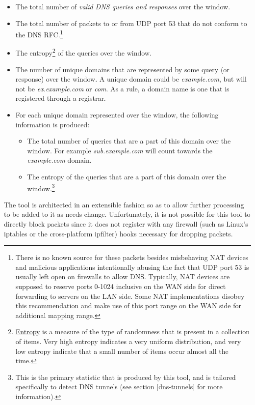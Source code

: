 \documentclass{article}
\theoremstyle{remark}
\theoremstyle{definition}
\theoremstyle{definition}
\theoremstyle{definition}
\begin{document}
\begin{itemize}
\item The total number of \emph{valid DNS queries and responses} over the window.
\item The total number of packets to or from UDP port 53 that do not conform to the DNS RFC.\footnote{There is no known source for these packets besides misbehaving NAT devices and malicious applications intentionally abusing the fact that UDP port 53 is usually left open on firewalls to allow DNS. Typically, NAT devices are supposed to reserve ports 0-1024 inclusive on the WAN side for direct forwarding to servers on the LAN side. Some NAT implementations disobey this recommendation and make use of this port range on the WAN side for additional mapping range.}
\item The entropy\footnote{\href{http://en.wikipedia.org/wiki/Entropy_(information_theory)}{Entropy} is a measure of the type of randomness that is present in a collection of items. Very high entropy indicates a very uniform distribution, and very low entropy indicate that a small number of items occur almost all the time.} of the queries over the window.
\item The number of unique domains that are represented by some query (or response) over the window. A unique domain could be \emph{example.com}, but will not be \emph{ex.example.com} or \emph{com}. As a rule, a domain name is one that is registered through a registrar.
\item For each unique domain represented over the window, the following information is produced:
\begin{itemize}
\item The total number of queries that are a part of this domain over the window. For example \emph{sub.example.com} will count towards the \emph{example.com} domain.
\item The entropy of the queries that are a part of this domain over the window.\footnote{This is the primary statistic that is produced by this tool, and is tailored specifically to detect DNS tunnels (see section \ref{dns-tunnels} for more information).}
\end{itemize}
\end{itemize}

The tool is architected in an extensible fashion so as to allow further processing to be added to it as needs change. Unfortunately, it is not possible for this tool to directly block packets since it does not register with any firewall (such as Linux's iptables or the cross-platform ipfilter) hooks necessary for dropping packets. 
\end{document}
